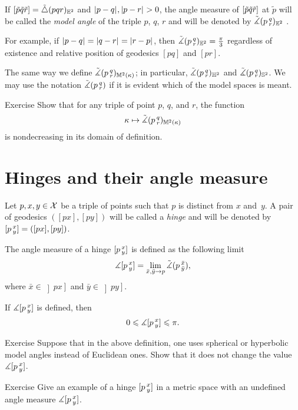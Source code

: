 If 
$[\tilde p\tilde q\tilde r]=\tilde\triangle(p q r)_{\mathbb{E}^2}$ 
and $|{p}-{q}|_{}^{{}},|{p}-{r}|_{}^{{}}>0$, 
the angle measure of 
$[\tilde p\tilde q\tilde r]$ at $\tilde p$ 
will be called the \emph{model angle} of the triple $p$, $q$, $r$ and will be denoted by
$\tilde\measuredangle(p\,{}^{q}_{r})_{\mathbb{E}^2}$%
.\label{page:model-angle}

For example, if $|{p}-{q}|_{}^{{}}=|{q}-{r}|_{}^{{}}=|{r}-{p}|_{}^{{}}$, then $\tilde\measuredangle(p\,{}^{q}_{r})_{\mathbb{E}^2}=\tfrac\pi3$ regardless of existence and relative position of geodesics $[pq]$ and $[pr]$.

The same way we define $\tilde\measuredangle(p\,{}^{q}_{r})_{\mathbb{M}^2(\kappa)}$;
in particular, $\tilde\measuredangle(p\,{}^{q}_{r})_{\mathbb{H}^2}$ and $\tilde\measuredangle(p\,{}^{q}_{r})_{\mathbb{S}^2}$.
We may use the notation $\tilde\measuredangle(p\,{}^{q}_{r})$ if it is evident which of the model spaces is meant.

\begin{thm}{Exercise}\label{ex:k-><mono}
Show that for any triple of point $p$, $q$, and $r$,
the function
\[\kappa\mapsto \tilde\measuredangle(p\,{}^{q}_{r})_{\mathbb{M}^2(\kappa)}\]
is nondecreasing in its domain of definition.
\end{thm}


\section{Hinges and their angle measure}\label{sec:angles}

 Let $p,x,y\in \mathcal{X}$ be a triple of points such that $p$ is distinct from $x$ and~$y$.
A pair of geodesics $([p x],[p y])$ will be called  a \emph{hinge} and will be denoted by 
$[p\,{}^{x}_{y}]=([p x],[p y])$.

The angle measure of a hinge $[p\,{}^{x}_{y}]$ is defined as the following limit
\[\measuredangle[p\,{}^{x}_{y}]=\lim_{\bar x,\bar y\to p} \tilde\measuredangle(p\,{}^{\bar x}_{\bar y}),\]
where $\bar x\in\left]p x\right]$ and $\bar y\in\left]p y\right]$.

If $\measuredangle[p\,{}^{x}_{y}]$ is defined, then
\[0\leqslant \measuredangle[p\,{}^{x}_{y}]\leqslant \pi.\]

\begin{thm}{Exercise}\label{ex:angkK}
Suppose that in the above definition, one uses spherical or hyperbolic model angles instead of Euclidean ones.
Show that it does not change the value $\measuredangle[p\,{}^{x}_{y}]$.
\end{thm}


\begin{thm}{Exercise}\label{ex:undefined-angle}
Give an example of a hinge $[p\,{}^{x}_{y}]$ in a metric space with an undefined angle measure $\measuredangle[p\,{}^{x}_{y}]$.
\end{thm}

